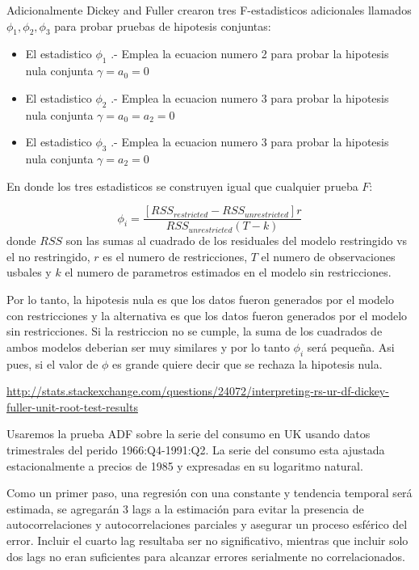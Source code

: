 \documentclass[]{book}
\providecommand{\tightlist}{%
  \setlength{\itemsep}{0pt}\setlength{\parskip}{0pt}}
\theoremstyle{definition}
\theoremstyle{definition}
\theoremstyle{definition}
\theoremstyle{remark}
\begin{document}
Adicionalmente Dickey and Fuller crearon tres F-estadisticos adicionales
llamados \(\phi_1,\phi_2,\phi_3\) para probar pruebas de hipotesis
conjuntas:

\begin{itemize}
\tightlist
\item
  El estadistico \(\phi_1\) .- Emplea la ecuacion numero 2 para probar
  la hipotesis nula conjunta \(\gamma=a_0=0\)
\item
  El estadistico \(\phi_2\) .- Emplea la ecuacion numero 3 para probar
  la hipotesis nula conjunta \(\gamma=a_0=a_2=0\)
\item
  El estadistico \(\phi_3\) .- Emplea la ecuacion numero 3 para probar
  la hipotesis nula conjunta \(\gamma=a_2=0\)
\end{itemize}

En donde los tres estadisticos se construyen igual que cualquier prueba
\(F\):

\[ \phi_i = \frac{[RSS_{restricted}-RSS_{unrestricted}]r}{RSS_{unrestricted}(T-k)}\]
donde \(RSS\) son las sumas al cuadrado de los residuales del modelo
restringido vs el no restringido, \(r\) es el numero de restricciones,
\(T\) el numero de observaciones usbales y \(k\) el numero de parametros
estimados en el modelo sin restricciones.

Por lo tanto, la hipotesis nula es que los datos fueron generados por el
modelo con restricciones y la alternativa es que los datos fueron
generados por el modelo sin restricciones. Si la restriccion no se
cumple, la suma de los cuadrados de ambos modelos deberian ser muy
similares y por lo tanto \(\phi_i\) será pequeña. Asi pues, si el valor
de \(\phi\) es grande quiere decir que se rechaza la hipotesis nula.

\url{http://stats.stackexchange.com/questions/24072/interpreting-rs-ur-df-dickey-fuller-unit-root-test-results}

Usaremos la prueba ADF sobre la serie del consumo en UK usando datos
trimestrales del perido 1966:Q4-1991:Q2. La serie del consumo esta
ajustada estacionalmente a precios de 1985 y expresadas en su logaritmo
natural.

Como un primer paso, una regresión con una constante y tendencia
temporal será estimada, se agregarán 3 lags a la estimación para evitar
la presencia de autocorrelaciones y autocorrelaciones parciales y
asegurar un proceso esférico del error. Incluir el cuarto lag resultaba
ser no significativo, mientras que incluir solo dos lags no eran
suficientes para alcanzar errores serialmente no correlacionados.
\end{document}
